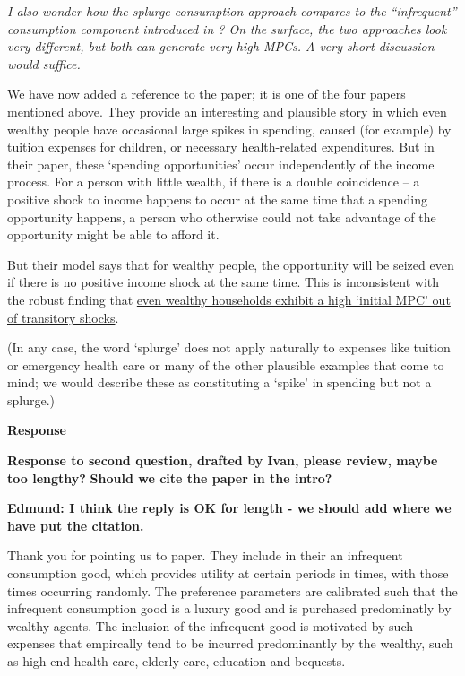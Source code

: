 \documentclass[12pt,letterpaper,english]{article}
\begin{document}
\begin{enumerate}
  \textit{I also wonder how the splurge consumption approach compares to the ``infrequent'' consumption component introduced in \citet{melcangiStock}? On the surface, the two approaches look very different, but both can generate very	high MPCs. A very short discussion would suffice.}

  We have now added a reference to the \citet{melcangiStock} paper; it is one of the four papers mentioned above.  They provide an interesting and plausible story in which even wealthy people have occasional large spikes in spending, caused (for example) by tuition expenses for children, or necessary health-related expenditures. But in their paper, these `spending opportunities' occur independently of the income process.  For a person with little wealth, if there is a double coincidence -- a positive shock to income happens to occur at the same time that a spending opportunity happens, a person who otherwise could not take advantage of the opportunity might be able to afford it.

  But their model says that for wealthy people, the opportunity will be seized even if there is no positive income shock at the same time.  This is inconsistent with the robust finding that \href{llorracc.github.io/HAFiscal/#wealthy-high-MPC}{even wealthy households exhibit a high `initial MPC' out of transitory shocks}.

  (In any case, the word `splurge' does not apply naturally to expenses like tuition or emergency health care or many of the other plausible examples that come to mind; we would describe these as constituting a `spike' in spending but not a splurge.)

\noindent \textbf{Response} 

\textbf{Response to second question, drafted by Ivan, please review, maybe too lengthy?} \textbf{Should we cite the paper in the intro?} 

\textbf{Edmund: I think the reply is OK for length - we should add where we have put the citation.}

Thank you for pointing us to \citet{melcangiStock} paper. They include in their an infrequent consumption good, which provides utility at certain periods in times, with those times occurring randomly. The preference parameters are calibrated such that the infrequent consumption good is a luxury good and is purchased predominatly by wealthy agents. The inclusion of the infrequent good is motivated by such expenses that empircally tend to be incurred predominantly by the wealthy, such as high-end health care, elderly care, education and bequests.


\end{enumerate}
\end{document}
